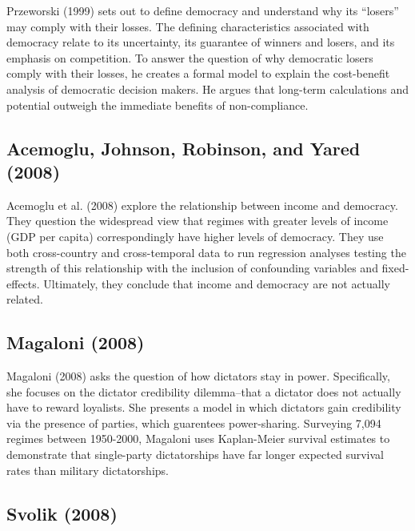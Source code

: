 \documentclass[
  english,
  man]{apa6}
\begin{document}
Przeworski (1999) sets out to define democracy and understand why its \enquote{losers} may comply with their losses. The defining characteristics associated with democracy relate to its uncertainty, its guarantee of winners and losers, and its emphasis on competition. To answer the question of why democratic losers comply with their losses, he creates a formal model to explain the cost-benefit analysis of democratic decision makers. He argues that long-term calculations and potential outweigh the immediate benefits of non-compliance.

\hypertarget{acemogluincomedemocracy2008}{%
\subsection{Acemoglu, Johnson, Robinson, and Yared (2008)}\label{acemogluincomedemocracy2008}}

Acemoglu et al. (2008) explore the relationship between income and democracy. They question the widespread view that regimes with greater levels of income (GDP per capita) correspondingly have higher levels of democracy. They use both cross-country and cross-temporal data to run regression analyses testing the strength of this relationship with the inclusion of confounding variables and fixed-effects. Ultimately, they conclude that income and democracy are not actually related.

\hypertarget{magalonicrediblepowersharinglongevity2008}{%
\subsection{Magaloni (2008)}\label{magalonicrediblepowersharinglongevity2008}}

Magaloni (2008) asks the question of how dictators stay in power. Specifically, she focuses on the dictator credibility dilemma--that a dictator does not actually have to reward loyalists. She presents a model in which dictators gain credibility via the presence of parties, which guarentees power-sharing. Surveying 7,094 regimes between 1950-2000, Magaloni uses Kaplan-Meier survival estimates to demonstrate that single-party dictatorships have far longer expected survival rates than military dictatorships.

\hypertarget{svolikauthoritarianreversalsdemocratic2008}{%
\subsection{Svolik (2008)}\label{svolikauthoritarianreversalsdemocratic2008}}
\end{document}
